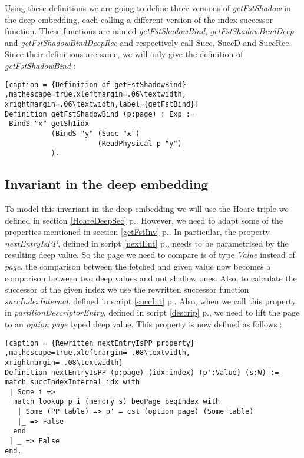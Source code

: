 Using these definitions we are going to define three versions of \textit{getFstShadow} in the deep embedding, each calling a different version of the index successor function. These functions are named \textit{getFstShadowBind}, \textit{getFstShadowBindDeep} and \textit{getFstShadowBindDeepRec} and respectively call Succ, SuccD and SuccRec. Since their definitions are same, we will only give the definition of \textit{getFstShadowBind} :

\begin{lstlisting}[caption = {Definition of getFstShadowBind} ,mathescape=true,xleftmargin=.06\textwidth,
xrightmargin=.06\textwidth,label={getFstBind}]
Definition getFstShadowBind (p:page) : Exp :=
 BindS "x" getSh1idx 
           (BindS "y" (Succ "x") 
                      (ReadPhysical p "y")
           ).
\end{lstlisting}
 
\subsection{Invariant in the deep embedding}
To model this invariant in the deep embedding we will use the Hoare triple we defined in section \ref{HoareDeepSec} p.\pageref{HoareDeepSec}. However, we need to adapt some of the properties mentioned in section \ref{getFstInv} p.\pageref{getFstInv}. In particular, the property \textit{nextEntryIsPP}, defined in script \ref{nextEnt} p.\pageref{nextEnt}, needs to be parametrised by the resulting deep value. So the page we need to compare is of type \textit{Value} instead of \textit{page}. the comparison between the fetched and given value now becomes a comparison between two deep values and not shallow ones. Also, to calculate the successor of the given index we use the rewritten successor function \textit{succIndexInternal}, defined in script \ref{succInt} p.\pageref{succInt}. Also, when we call this property in \textit{partitionDescriptorEntry}, defined in script \ref{descrip} p.\pageref{descrip}, we need to lift the page to an \textit{option page} typed deep value. This property is now defined as follows : 
\begin{lstlisting}[caption = {Rewritten nextEntryIsPP property} ,mathescape=true,xleftmargin=-.08\textwidth,
xrightmargin=-.08\textwidth]
Definition nextEntryIsPP (p:page) (idx:index) (p':Value) (s:W) := 
match succIndexInternal idx with 
 | Some i => 
  match lookup p i (memory s) beqPage beqIndex with 
   | Some (PP table) => p' = cst (option page) (Some table)
   |_ => False 
  end
 | _ => False 
end.
\end{lstlisting} \vspace{4pt}

